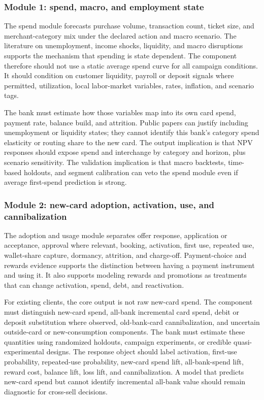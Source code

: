 \documentclass[11pt]{article}
\newcommand{\1}{\mathbf{1}}
\begin{document}
\subsubsection{Module 1: spend, macro, and employment state}
\label{subsec:module-spend-macro}

The spend module forecasts purchase volume, transaction count, ticket size,
and merchant-category mix under the declared action and macro scenario. The
literature on unemployment, income shocks, liquidity, and macro disruptions
supports the mechanism that spending is state dependent. The component
therefore should not use a static average spend curve for all campaign
conditions. It should condition on customer liquidity, payroll or deposit
signals where permitted, utilization, local labor-market variables, rates,
inflation, and scenario tags.

The bank must estimate how those variables map into its own card spend,
payment rate, balance build, and attrition. Public papers can justify including
unemployment or liquidity states; they cannot identify this bank's category
spend elasticity or routing share to the new card. The output implication is
that NPV responses should expose spend and interchange by category and horizon,
plus scenario sensitivity. The validation implication is that macro backtests,
time-based holdouts, and segment calibration can veto the spend module even if
average first-spend prediction is strong.

\subsubsection{Module 2: new-card adoption, activation, use, and cannibalization}
\label{subsec:module-adoption-use}

The adoption and usage module separates offer response, application or
acceptance, approval where relevant, booking, activation, first use, repeated
use, wallet-share capture, dormancy, attrition, and charge-off. Payment-choice
and rewards evidence supports the distinction between having a payment
instrument and using it. It also supports modeling rewards and promotions as
treatments that can change activation, spend, debt, and reactivation.

For existing clients, the core output is not raw new-card spend. The component
must distinguish new-card spend, all-bank incremental card spend, debit or
deposit substitution where observed, old-bank-card cannibalization, and
uncertain outside-card or new-consumption components. The bank must estimate
these quantities using randomized holdouts, campaign experiments, or credible
quasi-experimental designs. The response object should label activation,
first-use probability, repeated-use probability, new-card spend lift,
all-bank-spend lift, reward cost, balance lift, loss lift, and
cannibalization. A model that predicts new-card spend but cannot identify
incremental all-bank value should remain diagnostic for cross-sell decisions.
\end{document}
